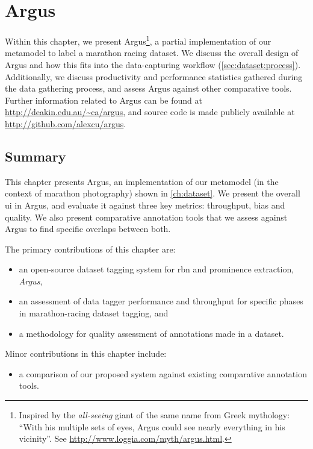 \chapter{Argus}
\label{ch:argus}

Within this chapter, we present Argus\footnote{Inspired by the \textit{all-seeing} giant of the same name from Greek mythology: ``With his multiple sets of eyes, Argus could see nearly everything in his vicinity''. See \url{http://www.loggia.com/myth/argus.html}.}, a partial implementation of our metamodel to label a marathon racing dataset. We discuss the overall design of Argus and how this fits into the data-capturing workflow (\cref{sec:dataset:process}). Additionally, we discuss productivity and performance statistics gathered during the data gathering process, and assess Argus against other comparative tools. Further information related to Argus can be found at \url{http://deakin.edu.au/~ca/argus}, and source code is made publicly available at \url{http://github.com/alexcu/argus}.





\section{Summary}

This chapter presents Argus, an implementation of our metamodel (in the context of marathon photography) shown in \cref{ch:dataset}. We present the overall \gls{ui} in Argus, and evaluate it against three key metrics: throughput, bias and quality. We also present comparative annotation tools that we assess against Argus to find specific overlaps between both.

\bigskip

\noindent
The primary contributions of this chapter are:

\begin{itemize}
  \item an open-source dataset tagging system for \gls{rbn} and prominence extraction, \textit{Argus},
  \item an assessment of data tagger performance and throughput for specific phases in marathon-racing dataset tagging, and
  \item a methodology for quality assessment of annotations made in a dataset.
\end{itemize}

\noindent
Minor contributions in this chapter include:

\begin{itemize}
  \item a comparison of our proposed system against existing comparative annotation tools.
\end{itemize}